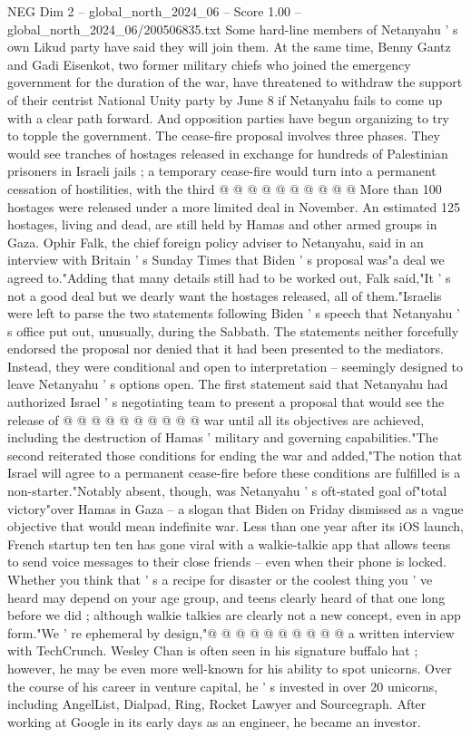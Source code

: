 \begin{textsample}{NEG Dim 2 – global\_north\_2024\_06 – Score 1.00 – global\_north\_2024\_06/200506835.txt}
Some hard-line members of Netanyahu ' s own Likud party have said they will join them.
At the same time, Benny Gantz and Gadi Eisenkot, two former military chiefs who joined the emergency government for the duration of the war, have threatened to withdraw the support of their centrist National Unity party by June 8 if Netanyahu fails to come up with a clear path forward.
And opposition parties have begun organizing to try to topple the government.
The cease-fire proposal involves three phases.
They would see tranches of hostages released in exchange for hundreds of Palestinian prisoners in Israeli jails ; a temporary cease-fire would turn into a permanent cessation of hostilities, with the third @ @ @ @ @ @ @ @ @ @ More than 100 hostages were released under a more limited deal in November.
An estimated 125 hostages, living and dead, are still held by Hamas and other armed groups in Gaza.
Ophir Falk, the chief foreign policy adviser to Netanyahu, said in an interview with Britain ' s Sunday Times that Biden ' s proposal was"a deal we agreed to."Adding that many details still had to be worked out, Falk said,"It ' s not a good deal but we dearly want the hostages released, all of them."Israelis were left to parse the two statements following Biden ' s speech that Netanyahu ' s office put out, unusually, during the Sabbath.
The statements neither forcefully endorsed the proposal nor denied that it had been presented to the mediators.
Instead, they were conditional and open to interpretation -- seemingly designed to leave Netanyahu ' s options open.
The first statement said that Netanyahu had authorized Israel ' s negotiating team to present a proposal that would see the release of @ @ @ @ @ @ @ @ @ @ war until all its objectives are achieved, including the destruction of Hamas ' military and governing capabilities."The second reiterated those conditions for ending the war and added,"The notion that Israel will agree to a permanent cease-fire before these conditions are fulfilled is a non-starter."Notably absent, though, was Netanyahu ' s oft-stated goal of"total victory"over Hamas in Gaza -- a slogan that Biden on Friday dismissed as a vague objective that would mean indefinite war.
Less than one year after its iOS launch, French startup ten ten has gone viral with a walkie-talkie app that allows teens to send voice messages to their close friends -- even when their phone is locked.
Whether you think that ' s a recipe for disaster or the coolest thing you ' ve heard may depend on your age group, and teens clearly heard of that one long before we did ; although walkie talkies are clearly not a new concept, even in app form."We ' re ephemeral by design,"@ @ @ @ @ @ @ @ @ @ a written interview with TechCrunch.
Wesley Chan is often seen in his signature buffalo hat ; however, he may be even more well-known for his ability to spot unicorns.
Over the course of his career in venture capital, he ' s invested in over 20 unicorns, including AngelList, Dialpad, Ring, Rocket Lawyer and Sourcegraph.
After working at Google in its early days as an engineer, he became an investor.

\end{textsample}
